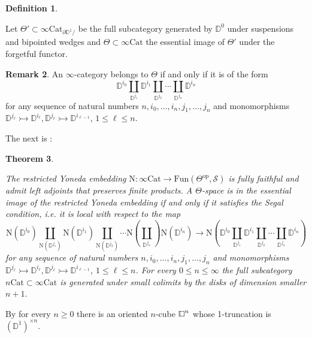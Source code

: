 \documentclass[10pt,oneside]{article}
\numberwithin{equation}{section} %
\numberwithin{figure}{section} %
\theoremstyle{plain}
\newtheorem{theorem}{Theorem}[subsection]
\theoremstyle{definition}
\newtheorem{definition}[theorem]{Definition}
\newtheorem{remark}[theorem]{Remark}
\newcommand{\bD}{{\mathbb D}}
\newcommand{\mS}{{\mathcal S}}
\newcommand{\N}{{\mathrm N}}
\newcommand{\op}{\mathrm{op}}
\newcommand{\Cat}{\mathrm{Cat}}
\newcommand{\Fun}{\mathrm{Fun}}
\newcommand{\cube}{{\,\vline\negmedspace\square}}
\begin{document}
\begin{definition}\label{Theta}
	
Let $\Theta' \subset \infty\Cat_{\partial\bD^1/}$ be the full subcategory generated by $\bD^0$ under suspensions and bipointed wedges and $\Theta \subset \infty\Cat$ the essential image of $\Theta'$ under the forgetful functor.	
	
\end{definition}

\begin{remark}

An $\infty$-category belongs to $\Theta$ if and only if it is of the form $$ \bD^{i_0} \coprod_{\bD^{j_1}} \bD^{i_1} \coprod_{\bD^{j_2}} \cdots \coprod_{\bD^{j_n}} \bD^{i_n} $$
for any sequence of natural numbers $n, i_0,\ldots, i_n, j_1,\ldots, j_n$ and monomorphisms 
$ \bD^{j_\ell} \rightarrowtail \bD^{i_\ell},\bD^{j_\ell} \rightarrowtail \bD^{i_{\ell-1}}$, $ 1 \leq \ell \leq n$.

\end{remark}

The next is \cite[Theorem 2.5.8.]{GepnerHeine2026}:

\begin{theorem}\label{theta}

The restricted Yoneda embedding $\N:
\infty\Cat \to \Fun(\Theta^\op,\mS)$ is fully faithful and admit left adjoints that preserves finite products.
A $\Theta$-space is in the essential image of the restricted Yoneda embedding if and only if it satisfies the Segal condition, i.e. it is local with respect to the map 
$$ \N(\bD^{i_0}) \coprod_{\N(\bD^{j_1})} \N(\bD^{i_1})\coprod_{\N(\bD^{j_2})} \cdots \N(\coprod_{\bD^{j_n}}) \N(\bD^{i_n}) \to \N(\bD^{i_0} \coprod_{\bD^{j_1}} \bD^{i_1} \coprod_{\bD^{j_2}} \cdots \coprod_{\bD^{j_n}} \bD^{i_n}) $$
for any sequence of natural numbers $n, i_0,\ldots, i_n, j_1,\ldots, j_n$ and monomorphisms 
$ \bD^{j_\ell} \rightarrowtail \bD^{i_\ell},\bD^{j_\ell} \rightarrowtail \bD^{i_{\ell-1}}$, $ 1 \leq \ell \leq n$. 
For every $ 0 \leq n \leq \infty$ the full subcategory $n\Cat \subset \infty\Cat$ is generated under small colimits by the disks of dimension smaller $n+1.$

\end{theorem}

By \cite[Definition 2.6.25.]{GepnerHeine2026} for every $n \geq 0$ there is an oriented $n$-cube $\cube^n$
whose 1-truncation is $(\bD^1)^{\times n}.$

\vspace{1mm}
\end{document}
